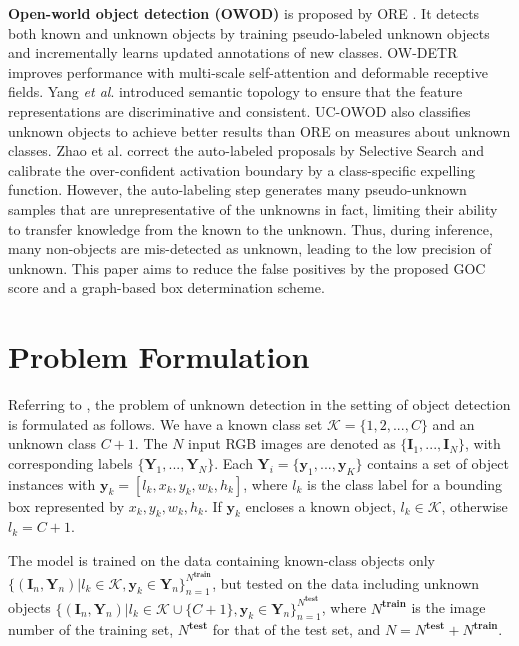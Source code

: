 \documentclass[10pt,twocolumn,letterpaper]{article}
\begin{document}
\noindent
\textbf{Open-world object detection (OWOD)} is proposed by ORE \cite{owod}.
It detects both known and unknown objects by training pseudo-labeled unknown objects and incrementally learns updated annotations of new classes.
OW-DETR \cite{OWDETR} improves performance with multi-scale self-attention and deformable receptive fields. Yang \emph{et al}. \cite{yang2021objects} introduced semantic topology to ensure that the feature representations are discriminative and consistent.
UC-OWOD \cite{wu2022uc} also classifies unknown objects to achieve better results than ORE on measures about unknown classes.
Zhao et al. \cite{rowod} correct the auto-labeled proposals by Selective Search and calibrate the over-confident activation boundary by a class-specific expelling function.
However, the auto-labeling step generates many pseudo-unknown samples that are unrepresentative of the unknowns in fact,
limiting their ability to transfer knowledge from the known to the unknown.
Thus, during inference, many non-objects are mis-detected as unknown,
leading to the low precision of unknown.
This paper aims to reduce the false positives by the proposed GOC score and a graph-based box determination scheme.


\section{Problem Formulation}


Referring to \cite{vos},
the problem of unknown detection in the setting of object detection is formulated as follows.
We have a known class set $\mathcal{K}=\{1,2,...,C\}$ and an unknown class $C+1$.
The $N$ input RGB images are denoted as $\{\mathbf{I}_1,...,\mathbf{I}_N\}$,
with corresponding labels $\{\mathbf{Y}_1,...,\mathbf{Y}_N\}$.
Each $\mathbf{Y}_i=\{\mathbf{y}_1,...,\mathbf{y}_K\}$ contains a set of object instances with $\mathbf{y}_k=[l_k,x_k,y_k,w_k,h_k]$,
where $l_k$ is the class label for a bounding box represented by $x_k,y_k,w_k,h_k$.
If $\mathbf{y}_k$ encloses a known object, $l_k\in\mathcal{K}$, otherwise $l_k = C+1$.

The model is trained on the data containing known-class objects only $\{(\mathbf{I}_n,\mathbf{Y}_n) | l_k\in\mathcal{K},\mathbf{y}_k\in\mathbf{Y}_{n}\}_{n=1}^{N^{\mathbf{train}}}$,
but tested on the data including unknown objects $\{(\mathbf{I}_n,\mathbf{Y}_n) | l_k\in\mathcal{K}\cup\{C+1\},\mathbf{y}_k\in\mathbf{Y}_{n}\}_{n=1}^{N^\mathbf{test}}$,
where $N^\mathbf{train}$ is the image number of the training set,
$N^\mathbf{test}$ for that of the test set,
and $N = N^\mathbf{test}+N^\mathbf{train}$.
\end{document}
